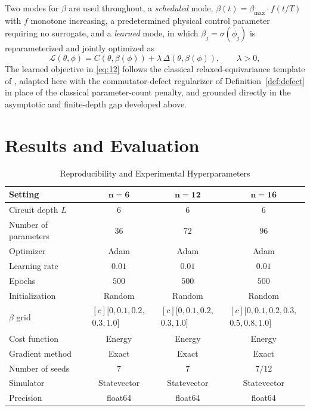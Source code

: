 \documentclass[pdflatex,sn-mathphys-num]{sn-jnl}
\theoremstyle{thmstyleone}
\theoremstyle{thmstyletwo}
\theoremstyle{thmstylethree}
\begin{document}
Two modes for $\beta$ are used throughout, a \emph{scheduled} mode, $\beta(t) = \beta_{\max}\cdot f(t/T)$ with $f$ monotone increasing, a predetermined physical control parameter requiring no surrogate, and a \emph{learned} mode, in which $\beta_j = \sigma(\phi_j)$ is reparameterized and jointly optimized as
\begin{equation}
\mathcal{L}(\theta,\phi) = C(\theta,\beta(\phi)) + \lambda\, \Delta(\theta,\beta(\phi)), \qquad \lambda > 0, \label{eq:12}
\end{equation}
The learned objective in \eqref{eq:12} follows the classical relaxed-equivariance template of \cite{vanderouderaa2022relaxed}, adapted here with the commutator-defect regularizer of Definition~\ref{def:defect} in place of the classical parameter-count penalty, and grounded directly in the asymptotic and finite-depth gap developed above.

\bigskip

\section{Results and Evaluation}

\begin{table}[!htbp]
\centering
\caption{Reproducibility and Experimental Hyperparameters}
\label{tab:reproducibility}
\footnotesize
\setlength{\tabcolsep}{2pt}
\renewcommand{\arraystretch}{1.12}
\begin{tabular}{@{}lccc@{}}
\toprule
\textbf{Setting} & $\mathbf{n=6}$ & $\mathbf{n=12}$ & $\mathbf{n=16}$ \\
\midrule
Circuit depth $L$ & $6$ & $6$ & $6$ \\
Number of parameters & $36$ & $72$ & $96$ \\
Optimizer & Adam & Adam & Adam \\
Learning rate & $0.01$ & $0.01$ & $0.01$ \\
Epochs & $500$ & $500$ & $500$ \\
Initialization & Random & Random & Random \\
$\beta$ grid & $\begin{gathered}[c] [0,0.1,0.2,\\0.3,1.0] \end{gathered}$
& $\begin{gathered}[c] [0,0.1,0.2,\\0.3,1.0] \end{gathered}$
& $\begin{gathered}[c] [0,0.1,0.2,0.3,\\0.5,0.8,1.0] \end{gathered}$ \\
Cost function & Energy & Energy & Energy \\
Gradient method & Exact & Exact & Exact \\
Number of seeds & $7$ & $7$ & $7/12$ \\
Simulator & Statevector & Statevector & Statevector \\
Precision & float64 & float64 & float64 \\
\bottomrule
\end{tabular}
\end{table}
\end{document}
